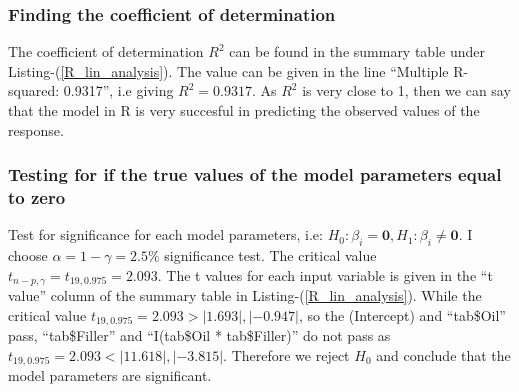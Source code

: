 \documentclass[12pt]{article}
\newcommand{\vect}[1]{\boldsymbol{#1}}
\begin{document}
\subsubsection{Finding the coefficient of determination}
The coefficient of determination $R^2$ can be found in the summary table under Listing-(\ref{R_lin_analysis}). The value can be given in the line \enquote{Multiple R-squared:  0.9317}, i.e giving $R^2=0.9317$. As $R^2$ is very close to 1, then we can say that the model in R is very succesful in predicting the observed values of the response.


\subsubsection{Testing for if the true values of the model parameters equal to zero}
Test for significance for each model parameters, i.e: $H_0: \beta_i = \vect{0}, H_1: \beta_i \neq \vect{0}$. I choose $\alpha = 1-\gamma = 2.5\%$ significance test. The critical value $t_{n-p, \gamma}=t_{19, 0.975} = 2.093$. The t values for each input variable is given in the \enquote{t value} column of the summary table in Listing-(\ref{R_lin_analysis}). While the critical value $t_{19, 0.975} = 2.093 > |1.693|, |-0.947|$, so the (Intercept) and \enquote{tab\$Oil} pass, \enquote{tab\$Filler} and \enquote{I(tab\$Oil * tab\$Filler)} do not pass as $t_{19, 0.975} = 2.093 < |11.618|, |-3.815|$. Therefore we reject $H_0$ and conclude that the model parameters are significant.
\end{document}
